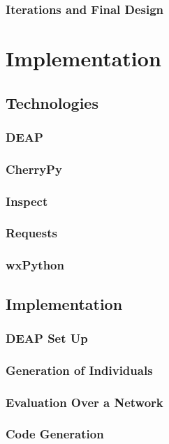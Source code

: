 \documentclass{l4proj}
\begin{document}
\subsection{Iterations and Final Design}

\chapter{Implementation}

\section{Technologies}
\subsection{DEAP}
\subsection{CherryPy}
\subsection{Inspect}
\subsection{Requests}
\subsection{wxPython}

\section{Implementation}
\subsection{DEAP Set Up}
\subsection{Generation of Individuals}
\subsection{Evaluation Over a Network}
\subsection{Code Generation}
\end{document}
